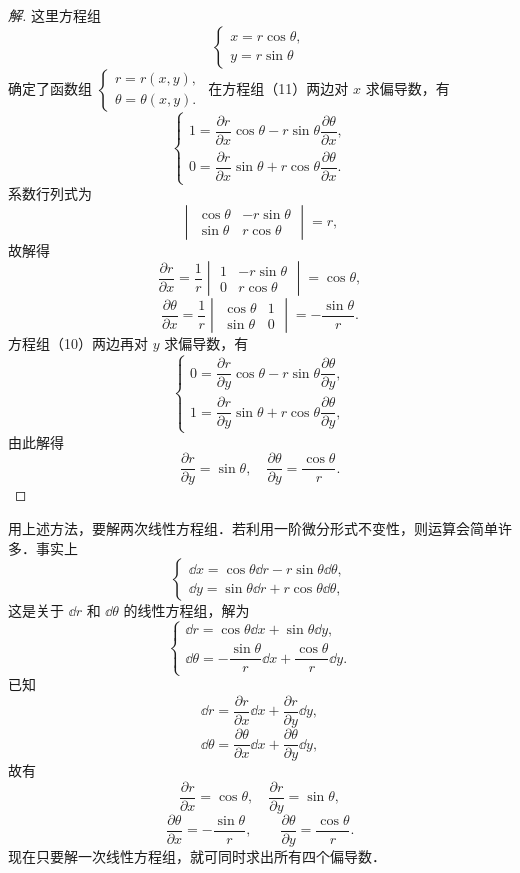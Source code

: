 \begin{proof}[解]
这里方程组
\begin{equation}
\begin{cases}
x=r\cos\theta,\\
y=r\sin\theta
\end{cases}
\tag{11}
\end{equation}
确定了函数组 $\begin{cases}r=r(x,y),\\ \theta=\theta(x,y).\end{cases}$ 在方程组（11）两边对 $x$ 求偏导数，有
\[
\begin{cases}
1=\dfrac{\partial r}{\partial x}\cos\theta-r\sin\theta\dfrac{\partial\theta}{\partial x},\\[6pt]
0=\dfrac{\partial r}{\partial x}\sin\theta+r\cos\theta\dfrac{\partial\theta}{\partial x}.
\end{cases}
\]
系数行列式为
\[
\begin{vmatrix}\cos\theta&-r\sin\theta\\ \sin\theta&r\cos\theta\end{vmatrix}=r,
\]
故解得
\[
\frac{\partial r}{\partial x}=\frac{1}{r}\begin{vmatrix}1&-r\sin\theta\\ 0&r\cos\theta\end{vmatrix}=\cos\theta,
\]
\[
\frac{\partial\theta}{\partial x}=\frac{1}{r}\begin{vmatrix}\cos\theta&1\\ \sin\theta&0\end{vmatrix}=-\frac{\sin\theta}{r}.
\]
方程组（10）两边再对 $y$ 求偏导数，有
\[
\begin{cases}
0=\dfrac{\partial r}{\partial y}\cos\theta-r\sin\theta\dfrac{\partial\theta}{\partial y},\\[6pt]
1=\dfrac{\partial r}{\partial y}\sin\theta+r\cos\theta\dfrac{\partial\theta}{\partial y},
\end{cases}
\]
由此解得
\[
\frac{\partial r}{\partial y}=\sin\theta,\quad \frac{\partial\theta}{\partial y}=\frac{\cos\theta}{r}.
\]
\end{proof}

用上述方法，要解两次线性方程组．若利用一阶微分形式不变性，则运算会简单许多．事实上
\[
\begin{cases}
\dd x=\cos\theta\dd r-r\sin\theta\dd\theta,\\
\dd y=\sin\theta\dd r+r\cos\theta\dd\theta,
\end{cases}
\]
这是关于 $\dd r$ 和 $\dd\theta$ 的线性方程组，解为
\[
\begin{cases}
\dd r=\cos\theta\dd x+\sin\theta\dd y,\\
\dd\theta=-\dfrac{\sin\theta}{r}\dd x+\dfrac{\cos\theta}{r}\dd y.
\end{cases}
\]
已知
\[
\dd r=\frac{\partial r}{\partial x}\dd x+\frac{\partial r}{\partial y}\dd y,
\]
\[
\dd\theta=\frac{\partial\theta}{\partial x}\dd x+\frac{\partial\theta}{\partial y}\dd y,
\]
故有
\[
\frac{\partial r}{\partial x}=\cos\theta,\quad \frac{\partial r}{\partial y}=\sin\theta,
\]
\[
\frac{\partial\theta}{\partial x}=-\frac{\sin\theta}{r},\qquad \frac{\partial\theta}{\partial y}=\frac{\cos\theta}{r}.
\]
现在只要解一次线性方程组，就可同时求出所有四个偏导数．

